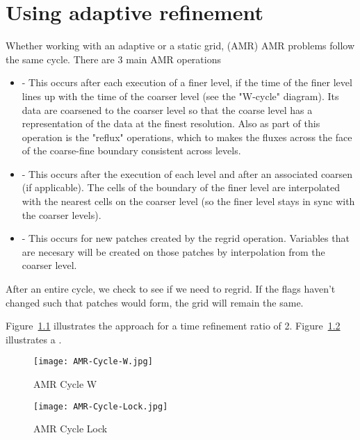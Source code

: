 \chapter{Using adaptive refinement}

Whether working with an adaptive or a static grid,  (AMR)
AMR problems follow the same cycle.  There are 3 main AMR operations 
\begin{itemize}
\item {} - This occurs after each execution of a finer level, if
  the time of the finer level lines up with the time of the coarser
  level (see the "W-cycle" diagram). Its data are coarsened to the
  coarser level so that the coarse level has a representation of the
  data at the finest resolution. Also as part of this operation is the
  "reflux" operations, which to makes the fluxes across the face of
  the coarse-fine boundary consistent across levels.
\item {} - This occurs after the
  execution of each level and after an associated coarsen (if
  applicable). The cells of the boundary of the finer level are
  interpolated with the nearest cells on the coarser level (so the
  finer level stays in sync with the coarser levels).
\item {} - This occurs for new patches created by the regrid
  operation. Variables that are necesary will be created on those
  patches by interpolation from the coarser level. 
\end{itemize}
After an entire cycle, we check to see if we need to regrid. If the flags 
haven't changed such that patches would form, the grid will remain the same. 

Figure~\ref{fig:amr2} illustrates the  approach for a
time refinement ratio of 2. 
Figure~\ref{fig:amr3} illustrates a .
\begin{figure}[htb]
  \centering
  \texttt{[image: AMR-Cycle-W.jpg]}
  \caption{AMR Cycle W}
  \label{fig:amr2}
\end{figure}
\begin{figure}[htb]
  \centering
  \texttt{[image: AMR-Cycle-Lock.jpg]}
  \caption{AMR Cycle Lock}
  \label{fig:amr3}
\end{figure}

